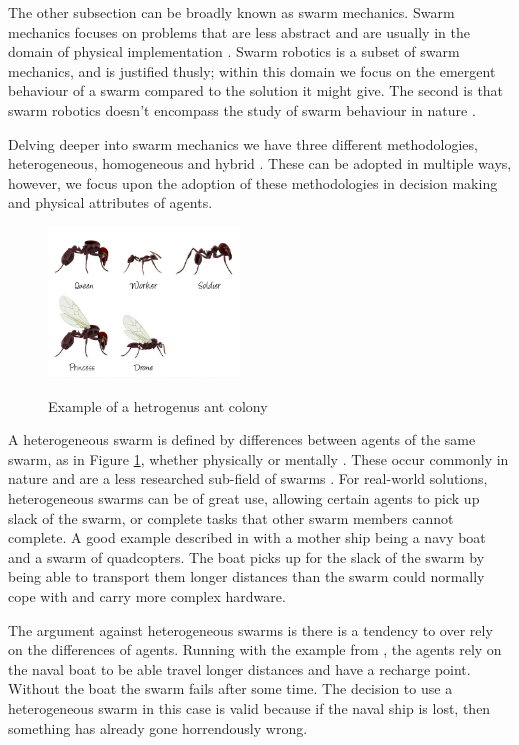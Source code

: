 \documentclass{UoYCSproject}
\begin{document}
The other subsection can be broadly known as swarm mechanics.
Swarm mechanics focuses on problems that are less abstract and are usually in the domain of physical implementation \cite{Cognitive maps mine detection, Probabalitic automata foraging robots}.
Swarm robotics is a subset of swarm mechanics, and is justified thusly; within this domain we focus on the emergent behaviour of a swarm compared to the solution it might give.
The second is that swarm robotics doesn’t encompass the study of swarm behaviour in nature \cite{Swarm intellegiegence, Ant communication}.

Delving deeper into swarm mechanics we have three different methodologies, heterogeneous, homogeneous and hybrid \cite{Swarm robotics reviewed}.
These can be adopted in multiple ways, however, we focus upon the adoption of these methodologies in decision making and physical attributes of agents.

\begin{figure}[htb]
\begin{center}
\label{fig:anthero}
\includegraphics[height=4cm]{"./ExplanationImgs/AntHetro.png"}
\end{center}
\caption{Example of a hetrogenus ant colony}
\end{figure}

A heterogeneous swarm is defined by differences between agents of the same swarm, as in Figure \ref{fig:anthero}, whether physically or mentally \cite{Swarm robotics reviewed, Swarm intellegiegence}.
These occur commonly in nature and are a less researched sub-field of swarms \cite{Swarm intellegiegence}.
For real-world solutions, heterogeneous swarms can be of great use, allowing certain agents to pick up slack of the swarm, or complete tasks that other swarm members cannot complete.
A good example described in \cite{Swarm robotics reviewed} with a mother ship being a navy boat and a swarm of quadcopters.
The boat picks up for the slack of the swarm by being able to transport them longer distances than the swarm could normally cope with and carry more complex hardware.

The argument against heterogeneous swarms is there is a tendency to over rely on the differences of agents.
Running with the example from \cite{Swarm robotics reviewed}, the agents rely on the naval boat to be able travel longer distances and have a recharge point.
Without the boat the swarm fails after some time.
The decision to use a heterogeneous swarm in this case is valid because if the naval ship is lost, then something has already gone horrendously wrong.
\end{document}
